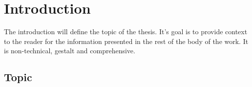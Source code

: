 \chapter{Introduction}
\label{cha:intro}

\begin{commentenv}
The introduction will define the topic of the thesis. It's goal is to provide context to the reader for the information presented in the rest of the body of the work. It is non-technical, gestalt and comprehensive.
\end{commentenv}

\section{Topic}
\label{sec:topic}


